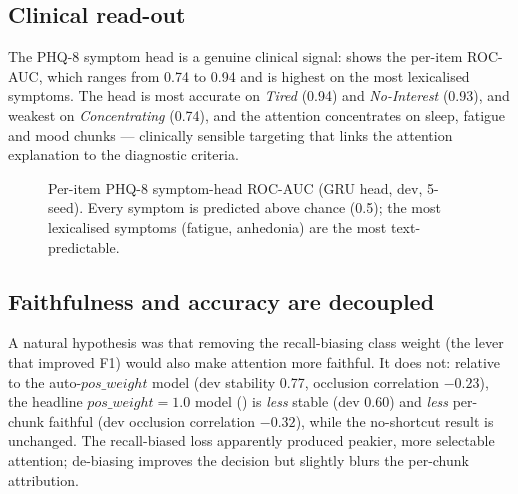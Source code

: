\documentclass[conference]{IEEEtran}
\begin{document}
\subsection{Clinical read-out}
The PHQ-8 symptom head is a genuine clinical signal:
 shows the per-item ROC-AUC, which ranges from 0.74 to 0.94
and is highest on the most lexicalised symptoms. The head is most accurate on
\emph{Tired} (0.94) and \emph{No-Interest} (0.93), and weakest on
\emph{Concentrating} (0.74), and the attention concentrates on sleep, fatigue
and mood chunks --- clinically sensible targeting that links the attention
explanation to the diagnostic criteria.

\begin{figure}[t]
\centering
{}
\caption{Per-item PHQ-8 symptom-head ROC-AUC (GRU head, dev, 5-seed). Every symptom is
predicted above chance (0.5); the most lexicalised symptoms (fatigue, anhedonia)
are the most text-predictable.}
\label{fig:symptom}
\end{figure}

\subsection{Faithfulness and accuracy are decoupled}
A natural hypothesis was that removing the recall-biasing class weight (the
lever that improved F1) would also make attention more faithful. It does not:
relative to the auto-$pos\_weight$ model (dev stability 0.77, occlusion
correlation $-0.23$), the headline $pos\_weight\!=\!1.0$ model ()
is \emph{less} stable (dev 0.60) and \emph{less} per-chunk faithful (dev
occlusion correlation $-0.32$), while the no-shortcut result is unchanged. The recall-biased loss apparently produced
peakier, more selectable attention; de-biasing improves the decision but
slightly blurs the per-chunk attribution.
\end{document}
